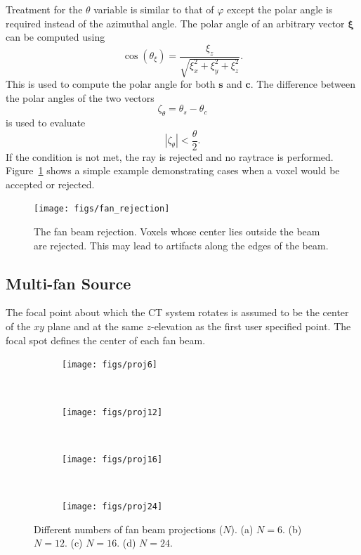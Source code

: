 Treatment for the $\theta$ variable is similar to that of $\varphi$ except the polar angle is required instead of the azimuthal angle. The polar angle of an arbitrary vector $\boldsymbol{\xi}$ can be computed using \begin{equation}\label{eq:thetacos}
\cos(\theta_\xi) = \frac{\xi_z}{\sqrt{\xi_x^2 + \xi_y^2 + \xi_z^2}}.
\end{equation}
This is used to compute the polar angle for both $\boldsymbol{s}$ and $\boldsymbol{c}$. The difference between the polar angles of the two vectors 
\begin{equation}\label{eq:thetacos2}
\zeta_\theta = \theta_s - \theta_c
\end{equation}
is used to evaluate
\begin{equation}\label{eq:thetacoscon}
|\zeta_\theta| < \frac{\theta}{2}.
\end{equation}
If the condition is not met, the ray is rejected and no raytrace is performed. Figure~\ref{fig:fan_rejection} shows a simple example demonstrating cases when a voxel would be accepted or rejected.

\begin{figure}[tb]
  \begin{center}
   \texttt{[image: figs/fan\_rejection]}
  \end{center}
  \caption{The fan beam rejection. Voxels whose center lies outside the beam are rejected. This may lead to artifacts along the edges of the beam.}
\label{fig:fan_rejection}
\end{figure}

\subsection{Multi-fan Source}
The focal point about which the CT system rotates is assumed to be the center of the $xy$ plane and at the same $z$-elevation as the first user specified point. The focal spot defines the center of each fan beam.

\begin{figure}
    \centering
    \begin{subfigure}[b]{0.2\textwidth}
        \texttt{[image: figs/proj6]}
        \caption{}
        \label{fig:proj6}
    \end{subfigure}
    ~ 
    \begin{subfigure}[b]{0.2\textwidth}
        \texttt{[image: figs/proj12]}
        \caption{}
        \label{fig:proj12}
    \end{subfigure}
    ~ 
    \begin{subfigure}[b]{0.2\textwidth}
        \texttt{[image: figs/proj16]}
        \caption{}
        \label{fig:proj16}
    \end{subfigure}
    ~
    \begin{subfigure}[b]{0.2\textwidth}
        \texttt{[image: figs/proj24]}
        \caption{}
        \label{fig:proj24}
    \end{subfigure}
    \caption{Different numbers of fan beam projections ($N$). (a) $N = 6$. (b) $N = 12$. (c) $N = 16$. (d) $N = 24$.}\label{fig:fanproj}
\end{figure}

